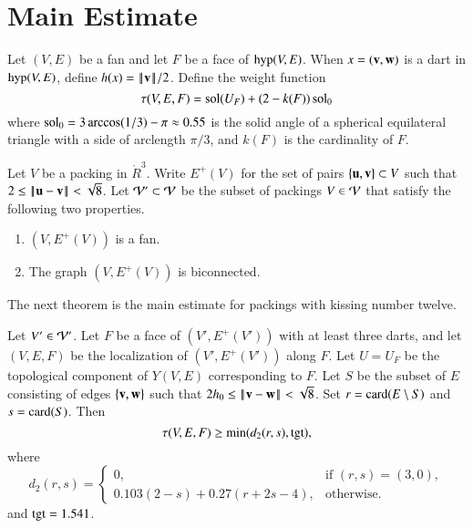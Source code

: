 \documentclass{llncs}
\def\op#1{{\hbox{#1}}}
\begin{document}
\section{Main Estimate}

Let $(V,E)$ be a fan and let $F$ be a face of $\op{hyp}(V,E)$.
When $x=({\mathbf v},{\mathbf w})$ is a dart in $\op{hyp}(V,E)$, define $h(x) = {\hbox{\ensuremath{\hspace{0.1em}|\hspace{-0.1em}|\hspace{0.1em}}}{\mathbf v}\hbox{\ensuremath{\hspace{0.1em}|\hspace{-0.1em}|\hspace{0.1em}}}}/2$.
Define the weight function
\begin{equation}
  \tau(V,E,F) 
  = \operatorname{sol}(U_F) + (2- k(F))\operatorname{sol}_0
\label{eqn:tau-sol}
\end{equation}
where $\operatorname{sol}_0=3\arccos(1/3)-\pi\approx 0.55$ is the solid angle of a
spherical equilateral triangle with a side of arclength $\pi/3$, and
$k(F)$ is the cardinality of $F$.



\begin{definition}[$\CalV'$,~$E^+(V)$]
Let $V$ be a packing in $\ring{R}^3$.
  Write
$E^+(V)$ for the set of pairs $\{{\mathbf u},{\mathbf v}\}\subset V$
  such that $2\le\norm{\u}{\v} <\sqrt8$.
Let ${\mathcal V}'\subset{\mathcal V}$ be the subset of packings $V\in{\mathcal V}$ that
satisfy the following two properties. 
\begin{enumerate}
\item  $(V,E^+(V))$ is a fan.
\item The graph $(V,E^+(V))$ is biconnected.
\end{enumerate}
\end{definition}
%
%



The next theorem is the main estimate for packings with kissing number twelve.



\begin{theorem}\label{lemma:main-estimate-12}
Let $V'\in {\mathcal V}'$.  
Let $F$ be a face of $(V',E^+(V'))$ with at least three darts, 
and let $(V,E,F)$ be the localization of $(V',E^+(V'))$ along $F$.
Let $U=U_F$ be the topological component of
  $Y(V,E)$ corresponding to $F$. 
Let
  $S$ be the subset of $E$ consisting of edges $\{{\mathbf v},{\mathbf w}\}$ such that $2h_0\le\norm{\v}{\w}<\sqrt8$.
  Set $r=\card(E\setminus S)$ and $s = \card(S)$.
Then
\begin{equation}\label{eqn:tau-tgt}
\tau(V,E,F) \ge \min(d_2(r,s),\op{tgt}),
\end{equation}
where 
\[ d_2(r,s) = 
\begin{cases}
0, & \text{if } (r,s)=(3,0),\\
0.103 (2-s) + 0.27 (r+2s-4), & \text{otherwise.}
\end{cases}
\] 
and
$\op{tgt}=1.541$.
\end{theorem}
%
\indy{Notation}{tgt@$\op{tgt}=1.541$}%
\end{document}

